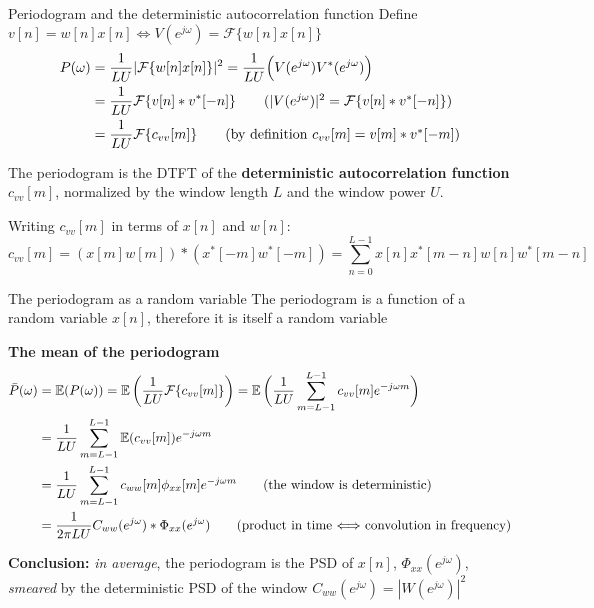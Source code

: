 \documentclass[10pt]{beamer}
\begin{document}
\begin{frame}{Periodogram and the deterministic autocorrelation function}
Define $v[n] = w[n]x[n] \Longleftrightarrow V(e^{j\omega}) = \mathcal{F}\{w[n]x[n]\}$
\begin{align*}
	P(\omega) &= \frac{1}{LU}|\mathcal{F}\{w[n]x[n]\}|^2 =  \frac{1}{LU}\Big(V(e^{j\omega})V^*(e^{j\omega})\Big) \\
	&=\frac{1}{LU}\mathcal{F}\{v[n]\ast v^*[-n]\} \tag{$|V(e^{j\omega})|^2 =\mathcal{F}\{v[n]\ast v^*[-n]\}$}  \\
	&=\frac{1}{LU}\mathcal{F}\{c_{vv}[m]\} \tag{by definition $c_{vv}[m] = v[m]\ast v^*[-m]$}
\end{align*}

The periodogram is the DTFT of the \textbf{deterministic autocorrelation function} $c_{vv}[m]$, normalized by the window length $L$ and the window power $U$.

\vspace{0.5cm}
Writing $c_{vv}[m]$ in terms of $x[n]$ and $w[n]$:
\begin{equation*}
	c_{vv}[m] = (x[m]w[m])\ast (x^*[-m]w^*[-m]) = \sum_{n = 0}^{L-1} x[n]x^*[m-n]w[n]w^*[m-n]
\end{equation*}

\end{frame}

\begin{frame}{The periodogram as a random variable}
The periodogram is a function of a random variable $x[n]$, therefore it is itself a random variable

\textbf{The mean of the periodogram}
\begin{align*}
	\bar{P}(\omega) &= \operatorname{\mathbb{E}}(P(\omega)) = \operatorname{\mathbb{E}}\bigg(\frac{1}{LU}\mathcal{F}\{c_{vv}[m]\}\bigg) = \operatorname{\mathbb{E}}\bigg(\frac{1}{LU}\sum_{m=L-1}^{L-1}c_{vv}[m]e^{-j\omega m}\bigg) \\
	& = \frac{1}{LU}\sum_{m=L-1}^{L-1}\operatorname{\mathbb{E}}(c_{vv}[m])e^{-j\omega m} \\
	& = \frac{1}{LU}\sum_{m=L-1}^{L-1}c_{ww}[m]\phi_{xx}[m]e^{-j\omega m} \tag{the window is deterministic} \\
	& = \frac{1}{2\pi LU}C_{ww}(e^{j\omega})\ast \Phi_{xx}(e^{j\omega}) \tag{product in time $\Longleftrightarrow$ convolution in frequency} \\
\end{align*}

\vspace{-0.25cm}
\textbf{Conclusion:} \textit{in average}, the periodogram is the PSD of $x[n]$, $\Phi_{xx}(e^{j\omega})$, \textit{smeared} by the deterministic PSD of the window $C_{ww}(e^{j\omega}) = |W(e^{j\omega})|^2$
\end{frame}
\end{document}
